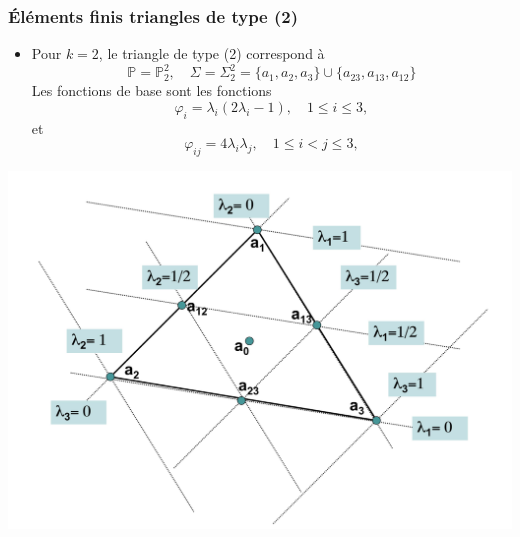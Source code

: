 \documentclass{beamer}
\begin{document}

\begin{frame}
\frametitle{Éléments finis triangles de type (2)}

\begin{itemize}

\item   Pour $k= 2$, le triangle de type (2) correspond à
    \[\mathbb{P}=\mathbb{P}_2^2,\quad \Sigma=\Sigma_2^2 = \{a_1,a_2,a_3\}\cup \{a_{23},a_{13},a_{12}\}\]
Les fonctions de base sont les fonctions
\[\varphi_i=\lambda_i(2\lambda_i-1), \quad 1\leq  i  \leq 3,\]
et   
\[\varphi_{ij}=4\lambda_i\lambda_j, \quad 1\leq  i<j  \leq 3,\]
\end{itemize}
\begin{center}
\includegraphics[scale=0.25]{equationsBarycentriques.png} 
\end{center}
\begin{center}
 \end{center}
\end{frame}

\end{document}
